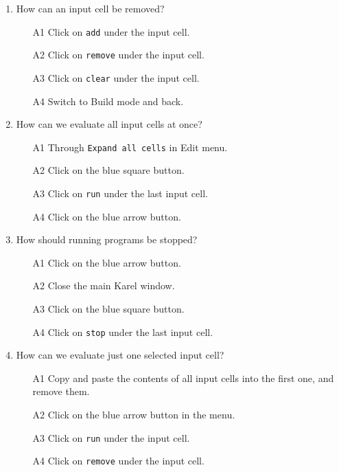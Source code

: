 {{{{\begin{enumerate}
\begin{enumerate}
\item[A3] Click on the bracket on the right of the cell.
\item[A4] Click on {\tt collapse} under the cell.
\end{enumerate}
\item How can an input cell be removed?
\begin{enumerate}
\item[A1] Click on {\tt add} under the input cell.
\item[A2] Click on {\tt remove} under the input cell.
\item[A3] Click on {\tt clear} under the input cell.
\item[A4] Switch to Build mode and back.
\end{enumerate}
\item How can we evaluate all input cells at once?
\begin{enumerate}
\item[A1] Through {\tt Expand all cells} in Edit menu.
\item[A2] Click on the blue square button.
\item[A3] Click on {\tt run} under the last input cell.
\item[A4] Click on the blue arrow button.
\end{enumerate}
\item How should running programs be stopped?
\begin{enumerate}
\item[A1] Click on the blue arrow button.
\item[A2] Close the main Karel window.
\item[A3] Click on the blue square button.
\item[A4] Click on {\tt stop} under the last input cell.
\end{enumerate}
\item How can we evaluate just one selected input cell?
\begin{enumerate}
\item[A1] Copy and paste the contents of all 
          input cells into the first one, and remove them.
\item[A2] Click on the blue arrow button in the menu. 
\item[A3] Click on {\tt run} under the input cell.
\item[A4] Click on {\tt remove} under the input cell.
\end{enumerate}
\end{enumerate}

}}}}
